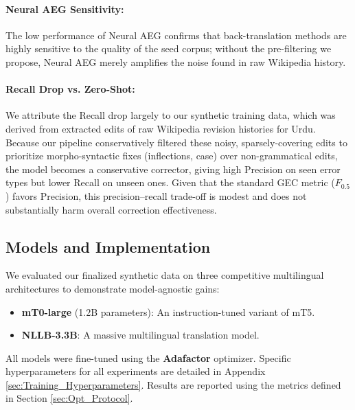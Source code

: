 \documentclass[11pt]{article}
\begin{document}
\paragraph{Neural AEG Sensitivity:} The low performance of Neural AEG confirms that back-translation methods are highly sensitive to the quality of the seed corpus; without the pre-filtering we propose, Neural AEG merely amplifies the noise found in raw Wikipedia history.

\paragraph{Recall Drop vs. Zero-Shot:} We attribute the Recall drop largely to our synthetic training data, which was derived from extracted edits of raw Wikipedia revision histories for Urdu. Because our pipeline conservatively filtered these noisy, sparsely-covering edits to prioritize morpho-syntactic fixes (inflections, case) over non-grammatical edits, the model becomes a conservative corrector, giving high Precision on seen error types but lower Recall on unseen ones. Given that the standard GEC metric ($F_{0.5}$) favors Precision, this precision–recall trade-off is modest and does not substantially harm overall correction effectiveness.

\subsection{Models and Implementation}
We evaluated our finalized synthetic data on three competitive multilingual architectures to demonstrate model-agnostic gains:
\begin{itemize}
    \item \textbf{mT0-large} (1.2B parameters): An instruction-tuned variant of mT5.
    \item \textbf{NLLB-3.3B}: A massive multilingual translation model.
\end{itemize}

All models were fine-tuned using the \textbf{Adafactor} optimizer. Specific hyperparameters for all experiments are detailed in Appendix \ref{sec:Training_Hyperparameters}. Results are reported using the metrics defined in Section \ref{sec:Opt_Protocol}.
\end{document}
